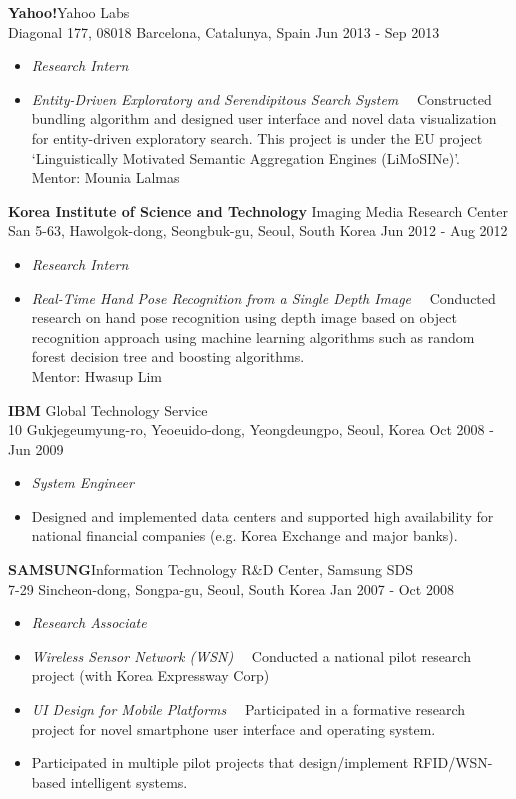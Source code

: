 \documentclass[10pt]{article}
\newenvironment{innerlist}[1][\enskip\textbullet]%
        {\begin{itemize}[#1,leftmargin=*,parsep=0pt,itemsep=0pt,topsep=0pt,partopsep=0pt]}
        {\end{itemize}}
\begin{document}
\textbf{Yahoo!}\hfill{Yahoo Labs}\\Diagonal 177, 08018 Barcelona, Catalunya, Spain \hfill {Jun 2013 - Sep 2013}
\begin{innerlist}
    \item[] \emph{Research Intern}
    \item[--] \emph{Entity-Driven Exploratory and Serendipitous Search System}~~
    Constructed bundling algorithm and designed user interface and novel data visualization for entity-driven exploratory search. This project is under the EU project `Linguistically Motivated Semantic Aggregation Engines (LiMoSINe)'. \\Mentor: Mounia Lalmas\\
\end{innerlist}
%
\textbf{Korea Institute of Science and Technology} \hfill{Imaging Media Research Center}\\
San 5-63, Hawolgok-dong, Seongbuk-gu, Seoul, South Korea \hfill {Jun 2012 - Aug 2012}
\begin{innerlist}
\item[] \emph{Research Intern}
\item[--] \emph{Real-Time Hand Pose Recognition from a Single Depth Image}~~
    Conducted research on hand pose recognition using depth image based on object recognition approach using machine learning algorithms such as random forest decision tree and boosting algorithms. \\Mentor: Hwasup Lim\\
\end{innerlist}
%
\textbf{IBM} \hfill{Global Technology Service}\\10 Gukjegeumyung-ro, Yeoeuido-dong, Yeongdeungpo, Seoul, Korea \hfill {Oct 2008 - Jun 2009}
\begin{innerlist}
\item[] \emph{System Engineer}
   \item[--] Designed and implemented data centers and supported high availability for national financial companies (e.g. Korea Exchange and major banks).\\
\end{innerlist}
%
\textbf{SAMSUNG}\hfill{Information Technology R\&D Center, Samsung SDS}\\7-29 Sincheon-dong, Songpa-gu, Seoul, South Korea
 \hfill {Jan 2007 - Oct 2008}
\begin{innerlist}
\item[] \emph{Research Associate}
   \item[--] \emph{Wireless Sensor Network (WSN)}~~
    Conducted a national pilot research project (with Korea Expressway Corp)
    \item[--] \emph{UI Design for Mobile Platforms}~~
    Participated in a formative research project for novel smartphone user interface and operating system.
    \item[--] Participated in multiple pilot projects that design/implement RFID/WSN-based intelligent systems.\\
\end{innerlist}
\end{document}

